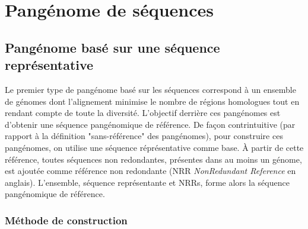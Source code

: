 \section{Pangénome de séquences}

\subsection{Pangénome basé sur une séquence représentative}

Le premier type de pangénome basé sur les séquences correspond à un ensemble de génomes dont l'alignement minimise le nombre de régions homologues tout en rendant compte de toute la diversité. L'objectif derrière ces pangénomes est d'obtenir une séquence pangénomique de référence. De façon contrintuitive (par rapport à la définition "sans-référence" des pangénomes), pour construire ces pangénomes, on utilise une séquence réprésentative comme base. À partir de cette référence, toutes séquences non redondantes, présentes dans au moins un génome, est ajoutée comme référence non redondante (NRR \textit{NonRedundant Reference} en anglais). L'ensemble, séquence représentante et NRRs, forme alors la séquence pangénomique de référence.

\subsubsection{Méthode de construction}

